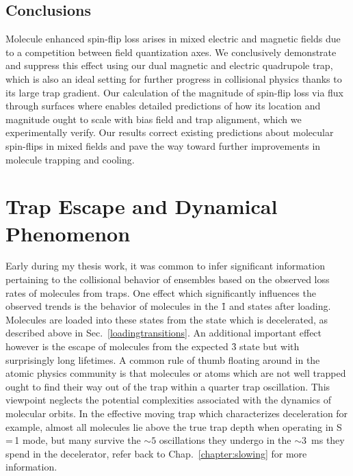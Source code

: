 \subsection{Conclusions}

Molecule enhanced spin-flip loss arises in mixed electric and magnetic fields due to a competition between field quantization axes.
We conclusively demonstrate and suppress this effect using our dual magnetic and electric quadrupole trap, which is also an ideal setting for further progress in collisional physics thanks to its large trap gradient.
Our calculation of the magnitude of spin-flip loss via flux through surfaces where \epb{} enables detailed predictions of how its location and magnitude ought to scale with bias field and trap alignment, which we experimentally verify.
Our results correct existing predictions about molecular spin-flips in mixed fields and pave the way toward further improvements in molecule trapping and cooling.

\section{Trap Escape and Dynamical Phenomenon}

Early during my thesis work, it was common to infer significant information pertaining to the collisional behavior of ensembles based on the observed loss rates of molecules from traps.
One effect which significantly influences the observed trends is the behavior of molecules in the \f1 and  states after loading.
Molecules are loaded into these states from the  state which is decelerated, as described above in Sec.~\ref{loadingtransitions}.
An additional important effect however is the escape of molecules from the expected \f3 state but with surprisingly long lifetimes.
A common rule of thumb floating around in the atomic physics community is that molecules or atoms which are not well trapped ought to find their way out of the trap within a quarter trap oscillation.
This viewpoint neglects the potential complexities associated with the dynamics of molecular orbits.
In the effective moving trap which characterizes deceleration for example, almost all molecules lie above the true trap depth when operating in S\,=\,1 mode, but many survive the $\sim5$ oscillations they undergo in the $\sim3$~ms they spend in the decelerator, refer back to Chap.~\ref{chapter:slowing} for more information.

